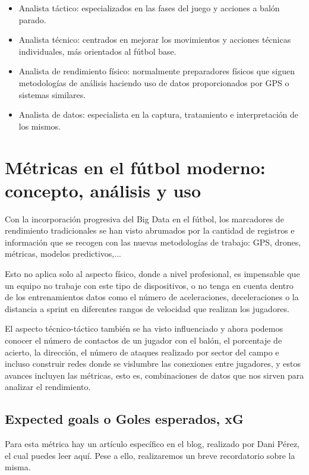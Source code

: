 \begin{itemize}
    \item Analista táctico: especializados en las fases del juego y acciones 
    a balón parado.
    \item Analista técnico: centrados en mejorar los movimientos y acciones 
    técnicas individuales, más orientados al fútbol base.
    \item Analista de rendimiento físico: normalmente preparadores físicos 
    que siguen metodologías de análisis haciendo uso de datos 
    proporcionados por GPS o sistemas similares.
    \item Analista de datos: especialista en la captura, tratamiento e 
    interpretación de los mismos.
\end{itemize}

\section{Métricas en el fútbol moderno: concepto, análisis y uso}
Con la incorporación progresiva del Big Data en el fútbol, 
los marcadores de rendimiento tradicionales se han visto 
abrumados por la cantidad de registros e información que 
se recogen con las nuevas metodologías de trabajo: GPS, drones, 
métricas, modelos predictivos,...

Esto no aplica solo al aspecto físico, donde a nivel profesional, 
es impensable que un equipo no trabaje con este tipo de dispositivos, 
o no tenga en cuenta dentro de los entrenamientos datos como el 
número de aceleraciones, deceleraciones o la distancia a sprint 
en diferentes rangos de velocidad que realizan los jugadores.

El aspecto técnico-táctico también se ha visto influenciado y 
ahora podemos conocer el número de contactos de un jugador con 
el balón, el porcentaje de acierto, la dirección, el número de 
ataques realizado por sector del campo e incluso construir 
redes donde se vislumbre las conexiones entre jugadores, y 
estos avances incluyen las métricas, esto es, combinaciones de datos 
que nos sirven para analizar el rendimiento.

\subsection{Expected goals o Goles esperados, xG}
Para esta métrica hay un artículo específico en el blog, realizado 
por Dani Pérez, el cual puedes leer aquí. Pese a ello, realizaremos 
un breve recordatorio sobre la misma.

